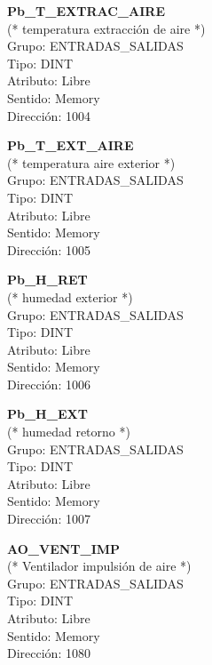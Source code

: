 \vspace{10mm}

\textbf{Pb\_T\_EXTRAC\_AIRE}\\ (* temperatura extracción de aire *)\\Grupo: ENTRADAS\_SALIDAS\\Tipo: DINT\\Atributo: Libre\\Sentido: Memory\\Dirección: 1004

\vspace{10mm}

\textbf{Pb\_T\_EXT\_AIRE}\\(* temperatura aire exterior *)\\Grupo: ENTRADAS\_SALIDAS\\Tipo: DINT\\Atributo: Libre\\Sentido: Memory\\Dirección: 1005

\vspace{10mm}

\textbf{Pb\_H\_RET}\\(* humedad exterior *)\\Grupo: ENTRADAS\_SALIDAS\\Tipo: DINT\\Atributo: Libre\\Sentido: Memory\\Dirección: 1006

\vspace{10mm}

\textbf{Pb\_H\_EXT}\\(* humedad retorno *)\\Grupo: ENTRADAS\_SALIDAS\\Tipo: DINT\\Atributo: Libre\\Sentido: Memory\\Dirección: 1007

\vspace{10mm}

\textbf{AO\_VENT\_IMP}\\(* Ventilador impulsión de aire *)\\Grupo: ENTRADAS\_SALIDAS\\Tipo: DINT\\Atributo: Libre\\Sentido: Memory\\Dirección: 1080

\vspace{10mm}

